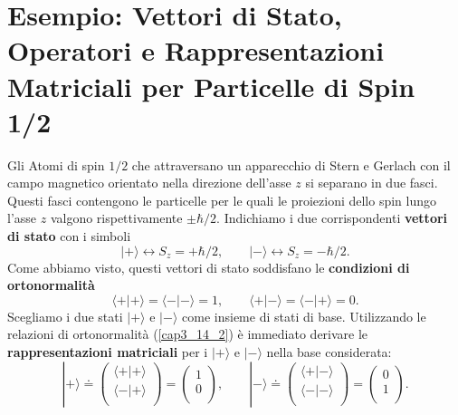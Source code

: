 \documentclass[a4paper,12pt,oneside]{book}
\begin{document}
\section[Esempio:Particelle di Spin 1/2]{Esempio: Vettori di Stato, Operatori e Rappresentazioni Matriciali per Particelle di Spin 1/2}
Gli Atomi di spin $1/2$ che attraversano un apparecchio di Stern e Gerlach con il campo magnetico orientato nella direzione dell'asse $z$ si separano in due fasci. Questi fasci contengono le particelle per le quali le proiezioni dello spin lungo l'asse $z$ valgono rispettivamente $\pm \hbar/2$. Indichiamo i due corrispondenti \textbf{vettori di stato} con i simboli
	\begin{equation}
		\boxed{
		| + \rangle \leftrightarrow S_z= +\hbar/2, \qquad | - \rangle \leftrightarrow S_z=-\hbar/2 .
		}
	\label{cap3_14}
	\end{equation}
Come abbiamo visto, questi vettori di stato soddisfano le \textbf{condizioni di ortonormalità}
	\begin{equation}
		\boxed{
			\langle + | + \rangle = \langle - | - \rangle =1,\qquad \langle + | - \rangle = \langle - | + \rangle =0 .
			}
	\label{cap3_14_2}
	\end{equation}
Scegliamo i due stati $| + \rangle $ e $ | - \rangle$ come insieme di stati di base. Utilizzando le relazioni di ortonormalità (\ref{cap3_14_2}) è immediato derivare le \textbf{rappresentazioni matriciali} per i $| + \rangle$ e $| - \rangle$ nella base considerata:
	\begin{equation}
		| + \rangle \doteq
		\begin{pmatrix}
		\langle + | + \rangle \\
		\langle - | + \rangle \\
		\end{pmatrix} = 
		\begin{pmatrix}
		1 \\
		0 \\
		\end{pmatrix}, \qquad
		| - \rangle \doteq
		\begin{pmatrix}
		\langle + | - \rangle \\
		\langle - | - \rangle \\
		\end{pmatrix} = 
		\begin{pmatrix}
		0 \\
		1 \\
		\end{pmatrix} .
	\end{equation}
\end{document}
